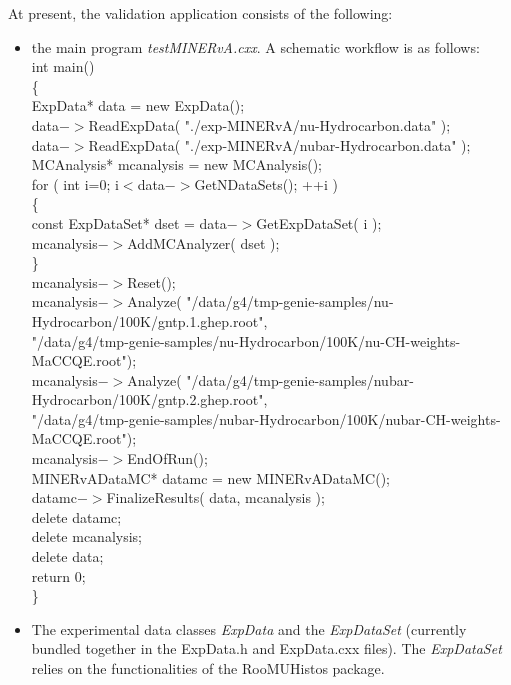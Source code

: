 At present, the validation application consists of the following:
\begin{itemize}
\item{the main program {\it testMINERvA.cxx}.
A schematic workflow is as follows: \\
{\small 
int main() \\
\{   \\
ExpData* data = new ExpData(); \\
data$->$ReadExpData( "./exp-MINERvA/nu-Hydrocarbon.data" ); \\
data$->$ReadExpData( "./exp-MINERvA/nubar-Hydrocarbon.data" ); \\
MCAnalysis* mcanalysis = new MCAnalysis(); \\
   for ( int i=0; i$<$data$->$GetNDataSets(); ++i ) \\
   \{ \\
      const ExpDataSet* dset   = data$->$GetExpDataSet( i ); \\
      mcanalysis$->$AddMCAnalyzer( dset ); \\
   \} \\
   mcanalysis$->$Reset(); \\
   mcanalysis$->$Analyze( "/data/g4/tmp-genie-samples/nu-Hydrocarbon/100K/gntp.1.ghep.root", \\
                        "/data/g4/tmp-genie-samples/nu-Hydrocarbon/100K/nu-CH-weights-MaCCQE.root"); \\
   mcanalysis$->$Analyze( "/data/g4/tmp-genie-samples/nubar-Hydrocarbon/100K/gntp.2.ghep.root", \\
                        "/data/g4/tmp-genie-samples/nubar-Hydrocarbon/100K/nubar-CH-weights-MaCCQE.root"); \\
   mcanalysis$->$EndOfRun(); \\
   MINERvADataMC* datamc = new MINERvADataMC(); \\   
   datamc$->$FinalizeResults( data, mcanalysis ); \\
   delete datamc; \\
   delete mcanalysis; \\
   delete data; \\
   return 0; \\
\} \\
}
}
\item{The experimental data classes {\it ExpData} and the {\it ExpDataSet} (currently bundled together 
in the ExpData.h and ExpData.cxx files). The {\it ExpDataSet} relies on the functionalities of the RooMUHistos 
package\cite{roomuhistos}.
}
\end{itemize}
